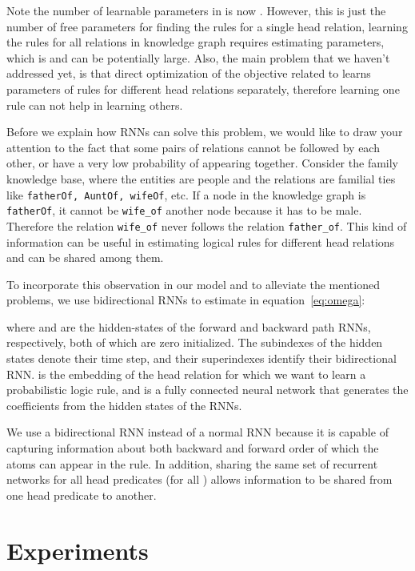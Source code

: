 \documentclass{article}
\begin{document}
Note the number of learnable parameters in  is now . However, this is just the number of free parameters for finding the rules for a single head relation, learning the rules for all relations in knowledge graph requires estimating  parameters, which is  and can be potentially large. Also, the main problem that we haven't addressed yet, is that direct optimization of the objective related to  learns parameters of rules for different head relations separately, therefore learning one rule can not help in learning others. 

Before we explain how RNNs can solve this problem, we would like to draw your attention to the fact that some pairs of relations cannot be followed by each other, or have a very low probability of appearing together. Consider the family knowledge base, where the entities are people and the relations are familial ties like \texttt{fatherOf, AuntOf, wifeOf}, etc. If a node in the knowledge graph is \texttt{fatherOf}, it cannot be \texttt{wife\_of} another node because it has to be male. Therefore the relation \texttt{wife\_of} never follows the  relation \texttt{father\_of}. This kind of information can be useful in estimating logical rules for different head relations and can be shared among them.

To incorporate this observation in our model and to alleviate the mentioned problems, we use  bidirectional RNNs to estimate  in equation~\ref{eq:omega}:

where  and  are the hidden-states of the forward and backward path RNNs, respectively, both of which are zero initialized. The subindexes of the hidden states denote their time step, and their superindexes identify their bidirectional RNN.  is the embedding of the head relation  for which we want to learn a probabilistic logic rule, and  is a fully connected neural network that generates the coefficients from the hidden states of the RNNs.

We use a bidirectional RNN instead of a normal RNN because it is capable of capturing information about both backward and forward order of which the atoms can appear in the rule. In addition, sharing the same set of recurrent networks for all head predicates (for all ) allows information to be shared from one head predicate to another.

\section{Experiments}
\label{sec:experiments}
\end{document}
